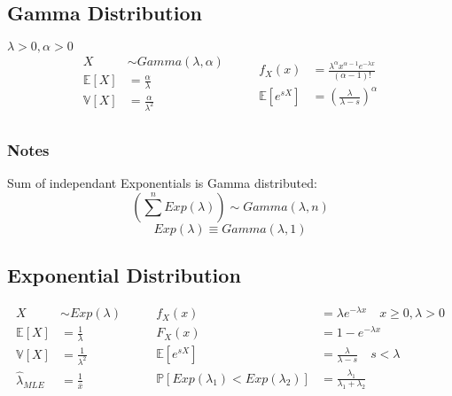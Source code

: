 \subsection{Gamma Distribution}
\(\lambda > 0, \alpha > 0 \)
\begin{equation*}
    \begin{aligned}
        X &\sim Gamma(\lambda, \alpha) \qquad\\
        \mathbb{E}[X] &= \frac{\alpha}{\lambda} \\
        \mathbb{V}[X] &= \frac{\alpha}{\lambda^2} \\
    \end{aligned}
    \begin{aligned}
        f_X(x) &= \frac{\lambda^\alpha x^{\alpha - 1} e^{-\lambda x}}{(\alpha - 1)!} \\
        \mathbb{E}[e^{sX}] &= \left(\frac{\lambda}{\lambda - s}\right)^\alpha \\
    \end{aligned}
\end{equation*}

\subsubsection{Notes}
Sum of independant Exponentials is Gamma distributed:
\begin{equation*}
    \left(\sum^{n} Exp(\lambda) \right) \sim Gamma(\lambda, n) 
\end{equation*}
\begin{equation*}
    Exp(\lambda) \equiv Gamma(\lambda, 1) 
\end{equation*}


\subsection{Exponential Distribution}
\begin{equation*}
    \begin{aligned}
        X &\sim Exp(\lambda) \qquad\\
        \mathbb{E}[X] &= \frac{1}{\lambda} \\
        \mathbb{V}[X] &= \frac{1}{\lambda^2} \\
        \hat{\lambda}_{MLE} &= \frac{1}{\bar{x}} \\
    \end{aligned}
    \begin{aligned}
        f_X(x) &= \lambda e^{-\lambda x} \quad x \ge 0, \lambda > 0 \\
        F_X(x) &= 1 - e^{-\lambda x} \\
        \mathbb{E}[e^{sX}] &= \frac{\lambda}{\lambda - s} \quad s < \lambda \\
        \mathbb{P}[Exp(\lambda_1) < Exp(\lambda_2)] &= \frac{\lambda_1}{\lambda_1 + \lambda_2}\\
    \end{aligned}
\end{equation*}

